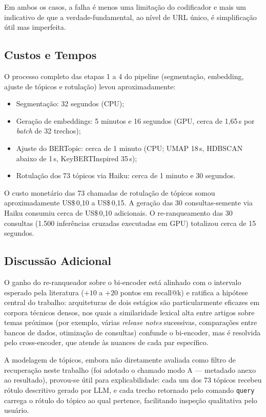 \documentclass[11pt,a4paper]{article}
\begin{document}
Em ambos os casos, a falha é menos uma limitação do codificador e mais um indicativo de que a verdade-fundamental, ao nível de URL único, é simplificação útil mas imperfeita.

\subsection{Custos e Tempos}

O processo completo das etapas 1 a 4 do pipeline (segmentação, embedding, ajuste de tópicos e rotulação) levou aproximadamente:

\begin{itemize}
  \item Segmentação: 32 segundos (CPU);
  \item Geração de embeddings: 5 minutos e 16 segundos (GPU, cerca de 1,65\,s por \textit{batch} de 32 trechos);
  \item Ajuste do BERTopic: cerca de 1 minuto (CPU; UMAP 18\,s, HDBSCAN abaixo de 1\,s, KeyBERTInspired 35\,s);
  \item Rotulação dos 73 tópicos via Haiku: cerca de 1 minuto e 30 segundos.
\end{itemize}

O custo monetário das 73 chamadas de rotulação de tópicos somou aproximadamente US\$\,0{,}10 a US\$\,0{,}15. A geração das 30 consultas-semente via Haiku consumiu cerca de US\$\,0{,}10 adicionais. O re-ranqueamento das 30 consultas (1.500 inferências cruzadas executadas em GPU) totalizou cerca de 15 segundos.

\subsection{Discussão Adicional}

O ganho do re-ranqueador sobre o bi-encoder está alinhado com o intervalo esperado pela literatura ($+10$ a $+20$ pontos em recall@k) e ratifica a hipótese central do trabalho: arquiteturas de dois estágios são particularmente eficazes em corpora técnicos densos, nos quais a similaridade lexical alta entre artigos sobre temas próximos (por exemplo, várias \textit{release notes} sucessivas, comparações entre bancos de dados, otimização de consultas) confunde o bi-encoder, mas é resolvida pelo cross-encoder, que atende às nuances de cada par específico.

A modelagem de tópicos, embora não diretamente avaliada como filtro de recuperação neste trabalho (foi adotado o chamado modo A --- metadado anexo ao resultado), provou-se útil para explicabilidade: cada um dos 73 tópicos recebeu rótulo descritivo gerado por LLM, e cada trecho retornado pelo comando \texttt{query} carrega o rótulo do tópico ao qual pertence, facilitando inspeção qualitativa pelo usuário.
\end{document}
